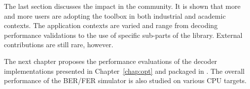The last section discusses the \AFFECT impact in the community. It is shown that
more and more users are adopting the toolbox in both industrial and academic
contexts. The application contexts are varied and range from decoding
performance validations to the use of specific sub-parts of the library.
External contributions are still rare, however.

The next chapter proposes the performance evaluations of the decoder
implementations presented in Chapter~\ref{chap:opt} and packaged in \AFFECT.
The overall performance of the BER/FER simulator is also studied on various CPU
targets.
